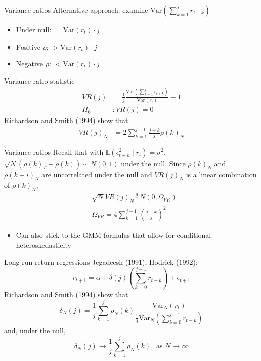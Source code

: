 \documentclass[xcolor=table, aspectratio=169]{beamer}
\begin{document}
\begin{frame}{Variance ratios}
Alternative approach: examine $\text{Var} \left( \sum_{k=1}^j r_{t+k} \right)$
\begin{itemize}
\item Under null: $= \text{Var}(r_t) \cdot j$
\item Positive $\rho$: $> \text{Var}(r_t) \cdot j$
\item Negative $\rho$: $< \text{Var}(r_t) \cdot j$
\end{itemize}
Variance ratio statistic
\begin{align*}
VR(j) &= \frac{1}{j} \frac{\text{Var} \left( \sum_{k=1}^j r_{t+k} \right)}{\text{Var}(r_t)} - 1 \\
H_0 &: VR(j) = 0
\end{align*}
Richardson and Smith (1994) show that 
\begin{align*}
VR(j)_N &= 2 \sum_{k=1}^{j-1} \frac{j-k}{j} \rho(k)_N
\end{align*}
\end{frame}

\begin{frame}{Variance ratios}
Recall that with $\mathbb{E} \left( \epsilon_{t+k}^2 \mid r_t \right) = \sigma^2$, $\sqrt{N}(\rho(k)_T - \rho(k)) \sim N(0,1)$ under the null. Since $\rho(k)_N$ and $\rho(k+i)_N$ are uncorrelated under the null and $VR(j)_N$ is a linear combination of $\rho(k)_N$,
\begin{align*}
&\sqrt{N} VR(j)_N \overset{a}{\sim} N(0,\Omega_{VR}) \\
&\Omega_{VR} = 4 \sum_{k=1}^{j-1} \left( \frac{j-k}{j} \right)^2
\end{align*}
\begin{itemize}
\item Can also stick to the GMM formulas that allow for conditional heteroskedasticity
\end{itemize}
\end{frame}

\begin{frame}{Long-run return regressions}
Jegadeesh (1991), Hodrick (1992):
$$r_{t+1} = \alpha + \delta(j) \left( \sum_{k=0}^{j-1} r_{t-k} \right) + \epsilon_{t+1}$$
Richardson and Smith (1994) show that 
$$\delta_N(j) = \frac{1}{j}\sum_{k=1}^j \rho_N(k) \frac{\text{Var}_N(r_t)}{\frac{1}{j} \text{Var}_N(\sum_{k=0}^{j-1} r_{t-k})} $$
and, under the null,
$$\delta_N(j) \rightarrow \frac{1}{j} \sum_{k=1}^j \rho_N(k), \text{ as } N \rightarrow \infty$$
\end{frame}
\end{document}
